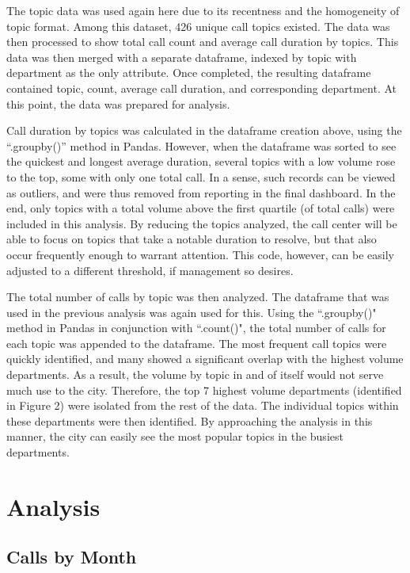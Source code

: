 \documentclass{article}
\begin{document}
The topic data was used again here due to its recentness and the homogeneity of topic format.  Among this dataset, 426 unique call topics existed.  The data was then processed to show total call count and average call duration by topics.  This data was then merged with a separate dataframe, indexed by topic with department as the only attribute.  Once completed, the resulting dataframe contained topic, count, average call duration, and corresponding department.  At this point, the data was prepared for analysis.
\par
Call duration by topics was calculated in the dataframe creation above, using the ``.groupby()'' method in Pandas.  However, when the dataframe was sorted to see the quickest and longest average duration, several topics with a low volume rose to the top, some with only one total call.  In a sense, such records can be viewed as outliers, and were thus removed from reporting in the final dashboard.  In the end, only topics with a total volume above the first quartile (of total calls) were included in this analysis.  By reducing the topics analyzed, the call center will be able to focus on topics that take a notable duration to resolve, but that also occur frequently enough to warrant attention.  This code, however, can be easily adjusted to a different threshold, if management so desires.
\par
The total number of calls by topic was then analyzed.  The dataframe that was used in the previous analysis was again used for this.  Using the ``.groupby()" method in Pandas in conjunction with ``.count()", the total number of calls for each topic was appended to the dataframe.  The most frequent call topics were quickly identified, and many showed a significant overlap with the highest volume departments.  As a result, the volume by topic in and of itself would not serve much use to the city.  Therefore, the top 7 highest volume departments (identified in Figure 2) were isolated from the rest of the data.  The individual topics within these departments were then identified.  By approaching the analysis in this manner, the city can easily see the most popular topics in the busiest departments.



\section{Analysis}

	\subsection{Calls by Month}
\end{document}
